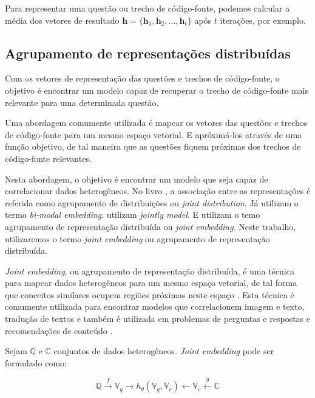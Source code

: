 Para representar uma questão ou trecho de código-fonte, podemos calcular a média dos vetores de resultado $\bm{h} = \{ \bm{h}_{1}, \bm{h}_{2}, . . ., \bm{h}_t \}$ após $t$ iterações, por exemplo.

\subsection{Agrupamento de representações distribuídas}

Com os vetores de representação das questões e trechos de código-fonte, o objetivo é encontrar um modelo capaz de recuperar o trecho de código-fonte mais relevante para uma determinada questão. 

Uma abordagem comumente utilizada é mapear os vetores das questões e trechos de código-fonte para um mesmo espaço vetorial. E apróximá-los através de uma função objetivo, de tal maneira que as questões fiquem próximas dos trechos de código-fonte relevantes. 

Nesta abordagem, o objetivo é encontrar um modelo que seja capaz de correlacionar dados heterogêneos. No livro \cite{Goodfellow-et-al-2016:representation-learning}, a associação entre as representações é referida como agrupamento de distribuições ou \textit{joint distribution}. Já \cite{Sachdev-neural-code-search:2018, Allamanis-bimodal-source-code-natural-language:2015} utilizam o termo \textit{bi-modal embedding}. \cite{Zhang:2019:deep-learning-recommender-survey} utilizam \textit{jointly model}. E \cite{Gu-deep-code-search:2018} utilizam o temo agrupamento de representação distribuída ou \textit{joint embedding}. Neste trabalho, utilizaremos o termo \textit{joint embedding} ou agrupamento de representação distribuída.


\textit{Joint embedding}, ou agrupamento de representação distribuída, é uma técnica para mapear dados heterogêneos para um mesmo espaço vetorial, de tal forma que conceitos similares ocupem regiões próximas neste espaço \citep{Gu-deep-code-search:2018}. Esta técnica é comumente utilizada para encontrar modelos que correlacionem imagem e texto, tradução de textos e também é utilizada em problemas de perguntas e respostas e recomendações de conteúdo \citep{lai-etal-2018-review, Zhang:2019:deep-learning-recommender-survey}.

Sejam $\mathbb{Q}$ e $\mathbb{C}$ conjuntos de dados heterogêneos. \textit{Joint embedding} pode ser formulado como:

\begin{equation}
        \mathbb{Q} \xrightarrow{f} \mathbb{V}_{q} \rightarrow h_{\theta}(\mathbb{V}_{q}, \mathbb{V}_{c}) \leftarrow \mathbb{V}_{c} \xleftarrow{g} \mathbb{C}
\end{equation}

